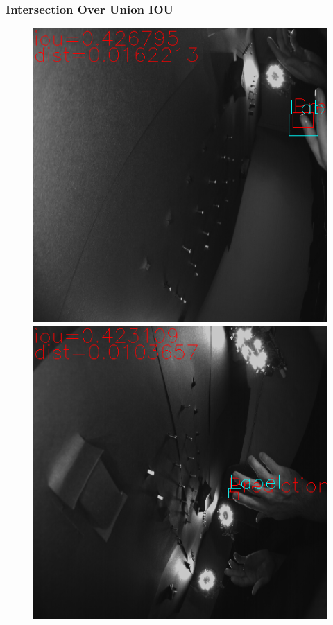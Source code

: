 \documentclass[a4paper,12pt]{article}
\begin{document}
\subsubsection{Intersection Over Union IOU}
\begin{figure}
	\centering
	\begin{minipage}[b]{0.48\textwidth}	
		\includegraphics[width=\textwidth]{BilderResultate/7iouKnappGut.png}
	\end{minipage}
	\hfill
	\begin{minipage}[b]{0.48\textwidth}		
		\includegraphics[width=\textwidth]{BilderResultate/8iouKnappGut.png}

\end{minipage}
\end{figure}
\end{document}
